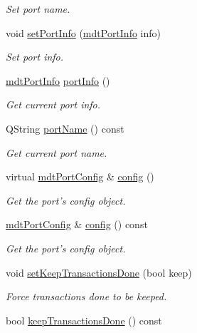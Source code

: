 \begin{DoxyCompactItemize}
\begin{DoxyCompactList}\small\item\em Set port name. \end{DoxyCompactList}\item 
void \hyperlink{classmdt_port_manager_a7e2ef93ec2731e66aa2b2d5f7ce9bc1c}{setPortInfo} (\hyperlink{classmdt_port_info}{mdtPortInfo} info)
\begin{DoxyCompactList}\small\item\em Set port info. \end{DoxyCompactList}\item 
\hypertarget{classmdt_port_manager_a88109b455fc5a5f5adf0636f7450143e}{
\hyperlink{classmdt_port_info}{mdtPortInfo} \hyperlink{classmdt_port_manager_a88109b455fc5a5f5adf0636f7450143e}{portInfo} ()}
\label{classmdt_port_manager_a88109b455fc5a5f5adf0636f7450143e}

\begin{DoxyCompactList}\small\item\em Get current port info. \end{DoxyCompactList}\item 
\hypertarget{classmdt_port_manager_af4fcab6aaad98d74aeabfc972da1d406}{
QString \hyperlink{classmdt_port_manager_af4fcab6aaad98d74aeabfc972da1d406}{portName} () const }
\label{classmdt_port_manager_af4fcab6aaad98d74aeabfc972da1d406}

\begin{DoxyCompactList}\small\item\em Get current port name. \end{DoxyCompactList}\item 
virtual \hyperlink{classmdt_port_config}{mdtPortConfig} \& \hyperlink{classmdt_port_manager_a9cf3ea2da38f81682695b37448712ffd}{config} ()
\begin{DoxyCompactList}\small\item\em Get the port's config object. \end{DoxyCompactList}\item 
\hyperlink{classmdt_port_config}{mdtPortConfig} \& \hyperlink{classmdt_port_manager_a735b7dc766fc2f45fb2cf9772c4201b0}{config} () const 
\begin{DoxyCompactList}\small\item\em Get the port's config object. \end{DoxyCompactList}\item 
void \hyperlink{classmdt_port_manager_a9adb5098766c9df588bc9978b00c5eb2}{setKeepTransactionsDone} (bool keep)
\begin{DoxyCompactList}\small\item\em Force transactions done to be keeped. \end{DoxyCompactList}\item 
\hypertarget{classmdt_port_manager_a798ce0939234870ae3b9995108e54380}{
bool \hyperlink{classmdt_port_manager_a798ce0939234870ae3b9995108e54380}{keepTransactionsDone} () const }
\label{classmdt_port_manager_a798ce0939234870ae3b9995108e54380}


\end{DoxyCompactItemize}

